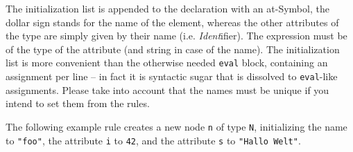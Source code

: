 The initialization list is appended to the declaration with an at-Symbol, the dollar sign stands for the name of the element, whereas the other attributes of the type are simply given by their name (i.e. \emph{Ident}ifier).
The expression must be of the type of the attribute (and string in case of the name). 
The initialization list is more convenient than the otherwise needed \texttt{eval} block, containing an assignment per line -- in fact it is syntactic sugar that is dissolved to \texttt{eval}-like assignments. 
Please take into account that the names must be unique if you intend to set them from the rules.

\begin{example}
The following example rule creates a new node \texttt{n} of type \texttt{N}, initializing the name to \texttt{"foo"}, the attribute \texttt{i} to \texttt{42}, and the attribute \texttt{s} to \texttt{"Hallo Welt"}.
\end{example}

